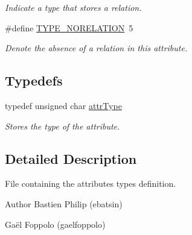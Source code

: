 \begin{DoxyCompactItemize}
\begin{DoxyCompactList}\small\item\em Indicate a type that stores a relation. \end{DoxyCompactList}\item 
\#define \hyperlink{attribute-types_8h_a1e56f613ed163aa25adcd4026e40928b}{T\+Y\+P\+E\+\_\+\+N\+O\+R\+E\+L\+A\+T\+I\+ON}~5\hypertarget{attribute-types_8h_a1e56f613ed163aa25adcd4026e40928b}{}\label{attribute-types_8h_a1e56f613ed163aa25adcd4026e40928b}

\begin{DoxyCompactList}\small\item\em Denote the absence of a relation in this attribute. \end{DoxyCompactList}\end{DoxyCompactItemize}
\subsection*{Typedefs}
\begin{DoxyCompactItemize}
\item 
typedef unsigned char \hyperlink{attribute-types_8h_a1d7db01768b8c6ad96eb92c7f6a30f1b}{attr\+Type}\hypertarget{attribute-types_8h_a1d7db01768b8c6ad96eb92c7f6a30f1b}{}\label{attribute-types_8h_a1d7db01768b8c6ad96eb92c7f6a30f1b}

\begin{DoxyCompactList}\small\item\em Stores the type of the attribute. \end{DoxyCompactList}\end{DoxyCompactItemize}


\subsection{Detailed Description}
File containing the attribute\textquotesingle{}s types definition. 

\begin{DoxyAuthor}{Author}
Bastien Philip (ebatsin) 

Gaël Foppolo (gaelfoppolo) 
\end{DoxyAuthor}
